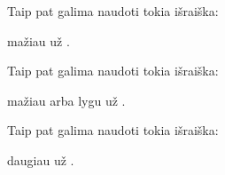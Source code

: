 \documentclass[letterpaper,10pt,lithuanian]{sphinxmanual}
\begin{document}

\begin{fulllineitems}
\label{\detokenize{formules:func.lt}}
\pysigstartsignatures
{}
\pysigstopsignatures
\sphinxAtStartPar
Taip pat galima naudoti tokia išraiška:

\begin{sphinxVerbatim}[commandchars=\\\{\}]
  
\end{sphinxVerbatim}

\sphinxAtStartPar
{} mažiau už .

\end{fulllineitems}


\begin{fulllineitems}
\label{\detokenize{formules:func.le}}
\pysigstartsignatures
{}
\pysigstopsignatures
\sphinxAtStartPar
Taip pat galima naudoti tokia išraiška:

\begin{sphinxVerbatim}[commandchars=\\\{\}]
  
\end{sphinxVerbatim}

\sphinxAtStartPar
{} mažiau arba lygu už .

\end{fulllineitems}


\begin{fulllineitems}
\label{\detokenize{formules:func.gt}}
\pysigstartsignatures
{}
\pysigstopsignatures
\sphinxAtStartPar
Taip pat galima naudoti tokia išraiška:

\begin{sphinxVerbatim}[commandchars=\\\{\}]
  
\end{sphinxVerbatim}

\sphinxAtStartPar
{} daugiau už .

\end{fulllineitems}
\end{document}
